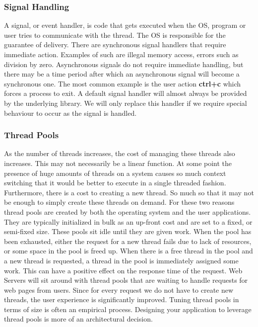 \documentclass[10pt,a4paper]{article}
\begin{document}
\subsubsection{Signal Handling}
A signal, or event handler, is code that gets executed when the OS, program or user tries to communicate with the thread. The OS is responsible for the guarantee of delivery. There are synchronous signal handlers that require immediate action. Examples of such are illegal memory access, errors such as division by zero. Asynchronous signals do not require immediate handling, but there may be a time period after which an asynchronous signal will become a synchronous one. The most common example is the user action {\bf ctrl+c} which forces a process to exit. A default signal handler will almost always be provided by the underlying library. We will only replace this handler if we require special behaviour to occur as the signal is handled.   
\subsubsection{Thread Pools}
As the number of threads increases, the cost of managing these threads also increases. This may not necessarily be a linear function. At some point the presence of huge amounts of threads on a system causes so much context switching that it would be better to execute in a single threaded fashion. Furthermore, there is a cost to creating a new thread. So much so that it may not be enough to simply create these threads on demand. For these two reasons thread pools are created by both the operating system and the user applications. They are typically initialized in bulk as an up-front cost and are set to a fixed, or semi-fixed size. These pools sit idle until they are given work. When the pool has been exhausted, either the request for a new thread fails due to lack of resources, or some space in the pool is freed up. When there is a free thread in the pool and a new thread is requested, a thread in  the pool is immediately assigned some work. This can have a positive effect on the response time of the request. Web Servers will sit around with thread pools that are waiting to handle requests for web pages from users. Since for every request we do not have to create new threads, the user experience is significantly improved. Tuning thread pools in terms of size is often an empirical process. Designing your application to leverage thread pools is more of an architectural decision.
\end{document}
